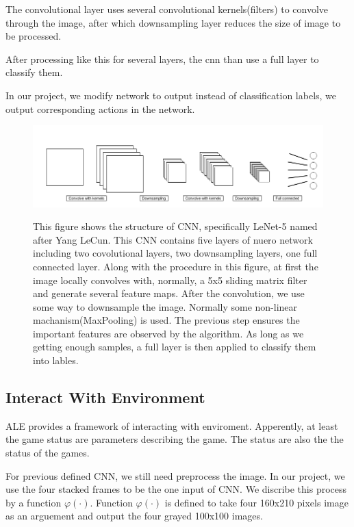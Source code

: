 \documentclass{article}
\begin{document}
The convolutional layer uses several convolutional kernels(filters) to convolve through the image, after which downsampling layer reduces the size of image to be processed.

After processing like this for several layers, the cnn than use a full layer to classify them.

In our project, we modify network to output instead of classification labels, we output corresponding actions in the network.

\begin{figure}
\centering
{\includegraphics[width = 1\textwidth]{cnn}} 
\caption{This figure shows the structure of CNN, specifically LeNet-5 named after Yang LeCun. This CNN contains five layers of nuero network including two covolutional layers, two downsampling layers, one full connected layer. Along with the procedure in this figure, at first the image locally convolves with, normally, a 5x5 sliding matrix filter and generate several feature maps. After the convolution, we use some way to downsample the image. Normally some non-linear machanism(MaxPooling) is used. The previous step ensures the important features are observed by the algorithm. As long as we getting enough samples, a full layer is then applied to classify them into lables.}\label{cnn}
\end{figure}

\subsection{Interact With Environment}

ALE provides a framework of interacting with enviroment. Apperently, at least the game status are parameters describing the game. The status are also the the status of the games.

For previous defined CNN, we still need preprocess the image. In our project, we use the four stacked frames to be the one input of CNN. We discribe this process by a function $\varphi(\cdot)$. Function $\varphi(\cdot)$ is defined to take four 160x210 pixels image as an arguement and output the four grayed 100x100 images.
\end{document}
